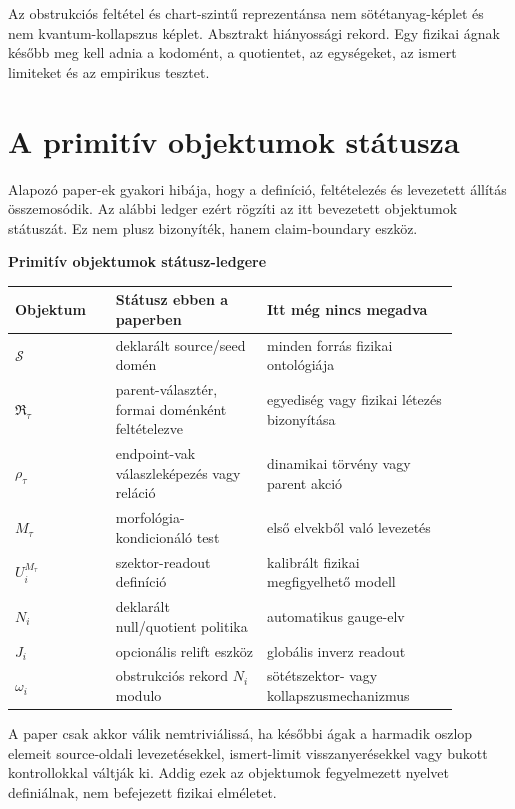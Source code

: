 \documentclass[12pt]{article}
\newcommand{\Ssrc}{\mathcal S}
\newcommand{\RTspace}{\mathfrak R_{\tau}}
\newcommand{\Rmap}{\rho_{\tau}}
\newcommand{\Mta}{M_{\tau}}
\begin{document}
Az obstrukciós feltétel és chart-szintű reprezentánsa nem sötétanyag-képlet és
nem kvantum-kollapszus képlet.  Absztrakt hiányossági rekord.  Egy fizikai
ágnak később meg kell adnia a kodomént, a quotientet, az egységeket, az ismert
limiteket és az empirikus tesztet.

\section{A primitív objektumok státusza}

Alapozó paper-ek gyakori hibája, hogy a definíció, feltételezés és levezetett
állítás összemosódik.  Az alábbi ledger ezért rögzíti az itt bevezetett
objektumok státuszát.  Ez nem plusz bizonyíték, hanem claim-boundary eszköz.

\begin{center}
\small
\textbf{Primitív objektumok státusz-ledgere}\\[0.5em]
\begin{tabular}{L{0.20\linewidth}L{0.30\linewidth}L{0.38\linewidth}}
\toprule
Objektum & Státusz ebben a paperben & Itt még nincs megadva\\
\midrule
\(\Ssrc\) & deklarált source/seed domén & minden forrás fizikai ontológiája\\
\(\RTspace\) & parent-választér, formai doménként feltételezve & egyediség vagy fizikai létezés bizonyítása\\
\(\Rmap\) & endpoint-vak válaszleképezés vagy reláció & dinamikai törvény vagy parent akció\\
\(\Mta\) & morfológia-kondicionáló test & első elvekből való levezetés\\
\(U_i^{\Mta}\) & szektor-readout definíció & kalibrált fizikai megfigyelhető modell\\
\(N_i\) & deklarált null/quotient politika & automatikus gauge-elv\\
\(J_i\) & opcionális relift eszköz & globális inverz readout\\
\(\omega_i\) & obstrukciós rekord \(N_i\) modulo & sötétszektor- vagy kollapszusmechanizmus\\
\bottomrule
\end{tabular}
\end{center}

A paper csak akkor válik nemtriviálissá, ha későbbi ágak a harmadik oszlop
elemeit source-oldali levezetésekkel, ismert-limit visszanyerésekkel vagy
bukott kontrollokkal váltják ki.  Addig ezek az objektumok fegyelmezett
nyelvet definiálnak, nem befejezett fizikai elméletet.
\end{document}
